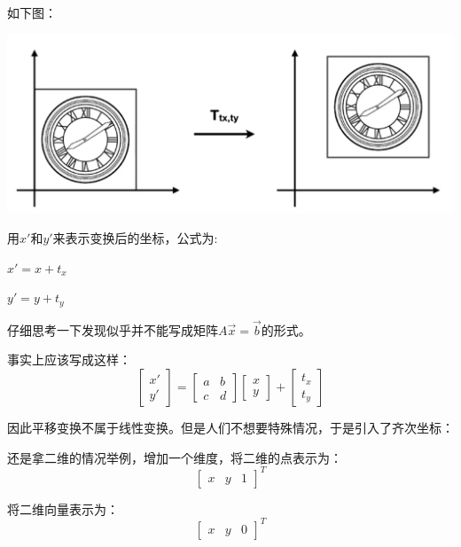 \documentclass[UTF8]{ctexbook}
\begin{document}
{{{{        如下图：

        \includegraphics[scale=0.25]{resources/homogeneous_coordinates.png}

        用$x\prime$和$y\prime$来表示变换后的坐标，公式为:

        $x\prime = x + t_x$

        $y\prime = y + t_y$

        仔细思考一下发现似乎并不能写成矩阵$A\vec{x} = \vec{b}$的形式。

        事实上应该写成这样：
        $$
          \left[\begin{array}{c}
              x\prime \\
              y\prime
            \end{array}\right]
          =
          \left[\begin{matrix}
              a & b \\
              c & d
            \end{matrix}\right]
          \left[\begin{array}{c}
              x \\
              y
            \end{array}\right]
          +
          \left[\begin{array}{c}
              t_x \\
              t_y
            \end{array}\right]
        $$

        因此平移变换不属于线性变换。但是人们不想要特殊情况，于是引入了齐次坐标：

        还是拿二维的情况举例，增加一个维度，将二维的点表示为：
        $$\left[\begin{array}{ccc}
              x & y & 1
            \end{array}\right]^T$$

        将二维向量表示为：
        $$\left[\begin{array}{ccc}
              x & y & 0
            \end{array}\right]^T$$

}}}}
\end{document}
